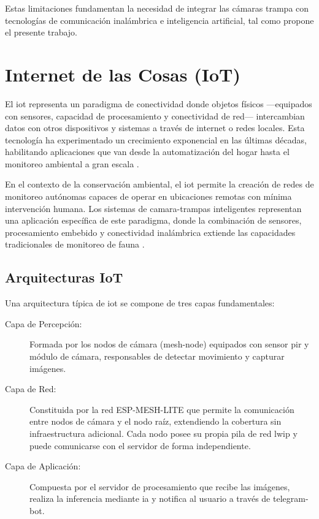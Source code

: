 \documentclass[a4paper, 12pt]{report}
\begin{document}
Estas limitaciones fundamentan la necesidad de integrar las cámaras trampa
con tecnologías de comunicación inalámbrica e inteligencia artificial, tal
como propone el presente trabajo.

\section{Internet de las Cosas (IoT)}

El \gls{iot} representa un paradigma de conectividad donde objetos físicos
---equipados con sensores, capacidad de procesamiento y conectividad de red---
intercambian datos con otros dispositivos y sistemas a través de internet o
redes locales. Esta tecnología ha experimentado un crecimiento exponencial en
las últimas décadas, habilitando aplicaciones que van desde la automatización
del hogar hasta el monitoreo ambiental a gran escala \cite{steenweg2017scaling}.

En el contexto de la conservación ambiental, el \gls{iot} permite la creación
de redes de monitoreo autónomas capaces de operar en ubicaciones remotas con
mínima intervención humana. Los sistemas de \glspl{camara-trampa} inteligentes
representan una aplicación específica de este paradigma, donde la combinación
de sensores, procesamiento embebido y conectividad inalámbrica extiende las
capacidades tradicionales de monitoreo de fauna \cite{whytock2023iridium}.

\subsection{Arquitecturas IoT}

Una arquitectura típica de \gls{iot} se compone de tres capas fundamentales:

\begin{description}
  \item[Capa de Percepción:] Formada por los nodos de cámara
    (mesh-node) equipados con sensor \gls{pir} y módulo de cámara,
    responsables de detectar movimiento y capturar imágenes.
  \item[Capa de Red:] Constituida por la red \gls{ESP-MESH-LITE} que
    permite la comunicación entre nodos de cámara y el nodo raíz,
    extendiendo la cobertura sin infraestructura adicional. Cada nodo
    posee su propia pila de red \gls{lwip} y puede comunicarse con el
    servidor de forma independiente.
  \item[Capa de Aplicación:] Compuesta por el servidor de
    procesamiento que recibe las imágenes, realiza la inferencia
    mediante \gls{ia} y notifica al usuario a través de \gls{telegram-bot}.
\end{description}
\end{document}
